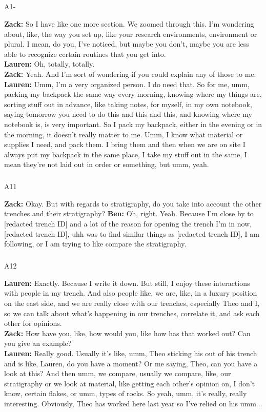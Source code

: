 \documentclass[
]{article}
\makeatletter
\let\oldsubparagraph\subparagraph
\renewcommand{\subparagraph}{
    \@ifstar
      \xxxSubParagraphStar
      \xxxSubParagraphNoStar
  }
\newcommand{\xxxSubParagraphStar}[1]{\oldsubparagraph*{#1}\mbox{}}
\newcommand{\xxxSubParagraphNoStar}[1]{\oldsubparagraph{#1}\mbox{}}
\makeatother
\begin{document}
\subparagraph{A1-}\label{sec-A10}

\textbf{Zack:} So I have like one more section. We zoomed through this.
I'm wondering about, like, the way you set up, like your research
environments, environment or plural. I mean, do you, I've noticed, but
maybe you don't, maybe you are less able to recognize certain routines
that you get into.\\
\textbf{Lauren:} Oh, totally, totally.\\
\textbf{Zack:} Yeah. And I'm sort of wondering if you could explain any
of those to me.\\
\textbf{Lauren:} Umm, I'm a very organized person. I do need that. So
for me, umm, packing my backpack the same way every morning, knowing
where my things are, sorting stuff out in advance, like taking notes,
for myself, in my own notebook, saying tomorrow you need to do this and
this and this, and knowing where my notebook is, is very important. So I
pack my backpack, either in the evening or in the morning, it doesn't
really matter to me. Umm, I know what material or supplies I need, and
pack them. I bring them and then when we are on site I always put my
backpack in the same place, I take my stuff out in the same, I mean
they're not laid out in order or something, but umm, yeah.

\subparagraph{A11}\label{sec-A11}

\textbf{Zack:} Okay. But with regards to stratigraphy, do you take into
account the other trenches and their stratigraphy? \textbf{Ben:} Oh,
right. Yeah. Because I'm close by to {[}redacted trench ID{]} and a lot
of the reason for opening the trench I'm in now, {[}redacted trench
ID{]}, uhh was to find similar things as {[}redacted trench ID{]}, I am
following, or I am trying to like compare the stratigraphy.

\subparagraph{A12}\label{sec-A12}

\textbf{Lauren:} Exactly. Because I write it down. But still, I enjoy
these interactions with people in my trench. And also people like, we
are, like, in a luxury position on the east side, and we are really
close with our trenches, especially Theo and I, so we can talk about
what's happening in our trenches, correlate it, and ask each other for
opinions.\\
\textbf{Zack:} How have you, like, how would you, like how has that
worked out? Can you give an example?\\
\textbf{Lauren:} Really good. Usually it's like, umm, Theo sticking his
out of his trench and is like, Lauren, do you have a moment? Or me
saying, Theo, can you have a look at this? And then umm, we compare,
usually we compare, like, our stratigraphy or we look at material, like
getting each other's opinion on, I don't know, certain flakes, or umm,
types of rocks. So yeah, umm, it's really, really interesting.
Obviously, Theo has worked here last year so I've relied on his umm...
\end{document}
